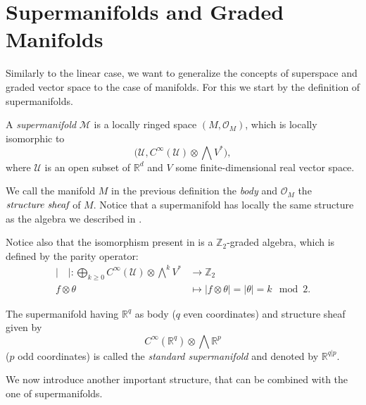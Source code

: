 \section{Supermanifolds and Graded Manifolds}
\label{sec:supermanifolds}

Similarly to the linear case, we want to generalize the concepts of superspace and graded vector space to the case of manifolds.
For this we start by the definition of supermanifolds.

\begin{definition}
\label{def:supermanifold}
    A \emph{supermanifold} $\mathcal{M}$ is a locally ringed space $(M, \mathcal{O}_M)$, which is locally isomorphic to
    \begin{equation*}
        \Big(\mathcal{U}, C^\infty(\mathcal{U}) \otimes \bigwedge V^*\Big),
    \end{equation*}
    where $\mathcal{U}$ is an open subset of $\mathbb{R}^d$ and $V$ some finite-dimensional real vector space.
\end{definition}

We call the manifold $M$ in the previous definition the \emph{body} and $\mathcal{O}_M$ the $\emph{structure sheaf}$ of $M$.
Notice that a supermanifold has locally the same structure as the algebra we described in .

Notice also that the isomorphism present in  is a $\mathbb{Z}_2$-graded algebra, which is defined by the parity operator:
\begin{align*}
    |\quad | : 
    \bigoplus_{k \geq 0} C^\infty(\mathcal{U}) \otimes \bigwedge^k V^* 
    &\rightarrow \mathbb{Z}_2 \\
    f \otimes \theta &
    \mapsto |f \otimes \theta| = |\theta| = k \! \! \mod{2}.
\end{align*}

\begin{example}
    The supermanifold having $\mathbb{R}^q$ as body ($q$ even coordinates) and structure sheaf given by
    \begin{equation*}
         C^\infty(\mathbb{R}^q) \otimes \bigwedge \mathbb{R}^p
    \end{equation*}
    ($p$ odd coordinates) is called the \emph{standard supermanifold} and denoted by $\mathbb{R}^{q|p}$.
\end{example}

We now introduce another important structure, that can be combined with the one of supermanifolds.

